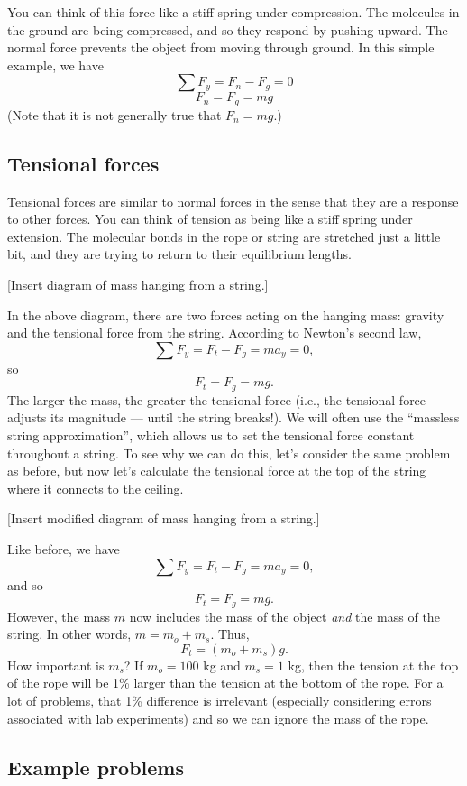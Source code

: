 You can think of this force like a stiff spring under compression. The molecules in the ground are being compressed, and so they respond by pushing upward. The normal force prevents the object from moving through ground. In this simple example, we have
$$\sum F_y=F_n-F_g=0$$
$$F_n=F_g=mg$$
(Note that it is not generally true that $F_n=mg$.)

\subsection{Tensional forces}
Tensional forces are similar to normal forces in the sense that they are a response to other forces. You can think of tension as being like a stiff spring under extension. The molecular bonds in the rope or string are stretched just a little bit, and they are trying to return to their equilibrium lengths.

[Insert diagram of mass hanging from a string.]
\vspace{3cm}

In the above diagram, there are two forces acting on the hanging mass: gravity and the tensional force from the string. According to Newton's second law, 
$$\sum F_y=F_t-F_g=ma_y=0,$$
so
$$F_t=F_g=mg.$$
The larger the mass, the greater the tensional force (i.e., the tensional force adjusts its magnitude --- until the string breaks!). We will often use the ``massless string approximation'', which allows us to set the tensional force constant throughout a string. To see why we can do this, let's consider 
the same problem as before, but now let's calculate the tensional force at the top of the string where it connects to the ceiling.

[Insert modified diagram of mass hanging from a string.]

\clearpage
Like before, we have
$$\sum F_y=F_t-F_g=ma_y=0,$$
and so
$$F_t=F_g=mg.$$
However, the mass $m$ now includes the mass of the object \textit{and} the mass of the string. In other words, $m=m_o+m_s$. Thus,
$$F_t=(m_o+m_s)g.$$
How important is $m_s$? If $m_o=100$ kg and $m_s=1$ kg, then the tension at the top of the rope will be 1\% larger than the tension at the bottom of the rope. For a lot of problems, that 1\% difference is irrelevant (especially considering errors associated with lab experiments) and so we can ignore the mass of the rope.

\subsection{Example problems}

